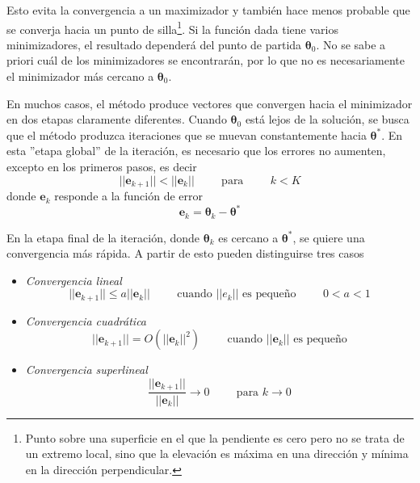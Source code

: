 Esto evita la convergencia a un maximizador y también hace menos probable que se converja hacia un punto de silla\footnote{Punto sobre una superficie en el que la pendiente es cero pero no se trata de un extremo local, sino que la elevación es máxima en una dirección y mínima en la dirección perpendicular.}. Si la función dada tiene varios minimizadores, el resultado dependerá del punto de partida $\bm{\theta}_0$. No se sabe a priori cuál de los minimizadores se encontrarán, por lo que no es necesariamente el minimizador más cercano a $\bm{\theta}_0$.

En muchos casos, el método produce vectores que convergen hacia el minimizador en dos etapas claramente diferentes. Cuando $\bm{\theta}_0$ está lejos de la solución, se busca que el método produzca iteraciones que se muevan constantemente hacia $\bm{\theta}^*$. En esta ''etapa global'' de la iteración, es necesario que los errores no aumenten, excepto en los primeros pasos, es decir
\begin{equation}
    ||\bm{e}_{k+1}|| < ||\bm{e}_k||\hspace{1cm}\text{para}\hspace{1cm}k<K
\end{equation}
donde $\bm{e}_k$ responde a la función de error
\begin{equation}
    \bm{e}_k = \bm{\theta}_k - \bm{\theta}^*
\end{equation}

En la etapa final de la iteración, donde $\bm{\theta}_k$ es cercano a $\bm{\theta}^*$, se quiere una convergencia más rápida. A partir de esto pueden distinguirse tres casos
\begin{itemize}
    \item \textit{Convergencia lineal}
    \begin{equation}
            ||\bm{e}_{k+1}|| \leq a||\bm{e}_k||\hspace{1cm}\text{cuando $||e_k||$ es pequeño}\hspace{1cm}0<a<1
    \end{equation}
    \item \textit{Convergencia cuadrática}
    \begin{equation}
        ||\bm{e}_{k+1}||=O(||\bm{e}_k||^2)\hspace{1cm}\text{cuando $||\bm{e}_k||$ es pequeño}
    \end{equation}
    \item \textit{Convergencia superlineal}
    \begin{equation}
        \frac{||\bm{e}_{k+1}||}{||\bm{e}_k||}\rightarrow 0\hspace{1cm}\text{para $k\rightarrow 0$}
    \end{equation}
\end{itemize}

